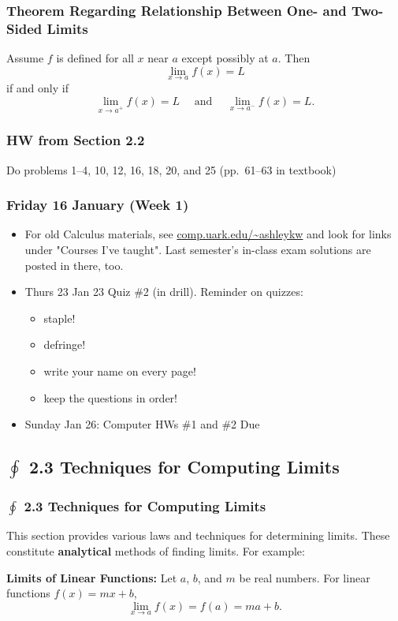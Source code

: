 \documentclass[14pt]{beamer}
\begin{document}
\begin{frame}
\frametitle{\small Theorem Regarding Relationship Between One- and Two-Sided Limits}
\begin{thm}Assume $f$ is defined for all $x$ near $a$ except possibly at $a$.  Then 
\[\lim_{x \to a} f(x)=L\] if and only if 
\[\lim_{x \to a^+} f(x)=L\quad\text{ and }\quad\lim_{x \to a^-} f(x)=L.\]
\end{thm}
\end{frame}

\begin{frame}
\frametitle{HW from Section 2.2}
Do problems 1--4, 10, 12, 16, 18, 20, and 25 (pp.\ 61--63 in textbook)
\end{frame}

\begin{frame}
\frametitle{Friday 16 January (Week 1)}
\small
\begin{itemize}
\item For old Calculus materials, see \url{comp.uark.edu/~ashleykw} and look for links under "Courses I've taught".  Last semester's in-class exam solutions are posted in there, too.
\item Thurs 23 Jan 23 Quiz \#2 (in drill).  Reminder on quizzes:
	\begin{itemize}\footnotesize
	\item staple!
	\item defringe!
	\item write your name on every page!
	\item keep the questions in order!
	\end{itemize}
\item Sunday Jan 26:  Computer HWs \#1  and \#2 Due
\end{itemize}
\end{frame}

\begin{frame}
\subsection[2.3 Techniques for Computing Limits]{$\oint$ 2.3 Techniques for Computing Limits}
\frametitle{$\oint$ 2.3 Techniques for Computing Limits}
This section provides various laws and techniques for determining limits.  These constitute {\bf analytical} methods of finding limits.  For example:

\vspace{1pc}
{\bf Limits of Linear Functions:}  Let $a$, $b$, and $m$ be real numbers.  For linear functions $f(x)=mx+b$,
\[\lim_{x \to a} f(x)=f(a)=ma+b.\]
\end{frame}
\end{document}
